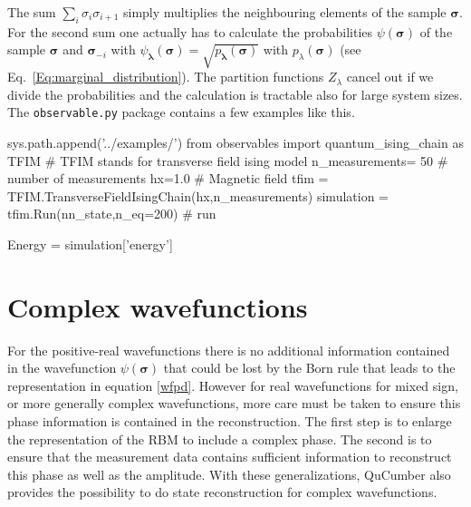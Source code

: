 \documentclass[submission, Phys]{SciPost}
\begin{document}
The sum $\sum_i \sigma_i \sigma_{i+1}$ simply multiplies the neighbouring elements of the sample $\bm{\sigma}$. For the second sum one actually has to calculate the probabilities $\psi (\bm{\sigma})$ of the sample $\bm{\sigma}$ and $\bm{\sigma}_{-i} $ with
$\psi_{\bm{\lambda}}(\bm{\sigma}) = \sqrt{p_{\bm{\lambda}}(\bm{\sigma})}$
with $p_{\lambda}(\bm{\sigma})$ (see Eq.~\ref{Eq:marginal_distribution}). The partition functions $Z_{\lambda}$ cancel out if we divide the probabilities and the calculation is tractable also for large system sizes.
The \verb|observable.py| package contains a few examples like this.

\begin{python}
	sys.path.append('../examples/')
	from observables import quantum_ising_chain as TFIM
	# TFIM stands for transverse field ising model
	n_measurements= 50 # number of measurements
	hx=1.0       # Magnetic field
	tfim = TFIM.TransverseFieldIsingChain(hx,n_measurements)
	simulation = tfim.Run(nn_state,n_eq=200) # run

	Energy = simulation['energy']
\end{python}



\section{Complex wavefunctions}
\label{Sec:Training_QuCumber_on_complex_wavefunctions}

For the positive-real wavefunctions there is no additional information contained in the wavefunction
$\psi( \boldsymbol{\sigma})$ that could be lost by the Born rule that leads to the representation in equation \ref{wfpd}.
However for real wavefunctions for mixed sign, or more generally complex wavefunctions, more care must be taken to ensure 
this phase information is contained in the reconstruction.  The first step is to enlarge the representation of the RBM to 
include a complex phase.  The second is to ensure that the measurement data contains sufficient information to reconstruct
this phase as well as the amplitude.  With these generalizations, QuCumber also provides the possibility to do state reconstruction for complex wavefunctions.
\end{document}
